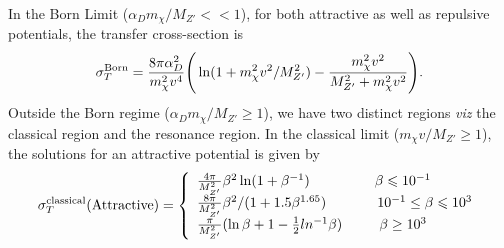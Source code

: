 \documentclass[prd,nofootinbib,preprint,superscriptaddress]{revtex4}
\begin{document}
		In the Born Limit ($\alpha_D m_\chi/M_{Z'}<< 1$), for both attractive as well as repulsive potentials, the transfer cross-section is
		\begin{equation}
			\sigma^{\rm Born}_T = \frac{8 \pi \alpha^2_D}{m^2_\chi v^4} \Bigg(\ln(1+ m^2_\chi v^2/M^2_{Z'} ) - \frac{m^2_\chi v^2}{M^2_{Z'}+ m^2_\chi v^2}\Bigg).
		\end{equation} 
		Outside the Born regime ($\alpha_D m_\chi /M_{Z'} \geq 1 $), we have two distinct regions {\it viz} the classical region and the resonance region. In the classical limit ($m_\chi v/M_{Z'}\geq 1$), the solutions for an attractive potential is given by\cite{Tulin:2013teo,Tulin:2012wi,Khrapak:2003kjw}
		\begin{equation}
			\sigma^{\rm classical}_T (\rm Attractive)=\left\{
			\begin{array}{l}
				
				\frac{4\pi}{M^2_{Z'}}\beta^2 \ln(1+\beta^{-1}) ~~~~~~~~~~~~~~\beta \leqslant 10^{-1}\\
				\frac{8\pi}{M^2_{Z'}}\beta^2/(1+1.5\beta^{1.65}) ~~~~~~~~~~~10^{-1}\leq \beta \leqslant 10^{3}\\
				\frac{\pi}{M^2_{Z'}}( \ln\beta + 1 -\frac{1}{2}ln^{-1}\beta) ~~~~~~~~\beta \geq 10^{3}\\
			\end{array}
			\right.
		\end{equation}  
		
\end{document}
